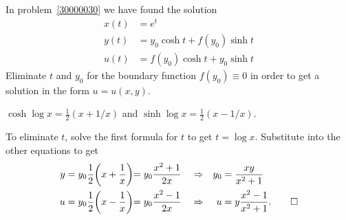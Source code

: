 In problem~\ref{30000030} we have found the solution
\begin{align*}
x(t) &= e^t           \\
y(t) &= y_0 \cosh t + f(y_0) \sinh t   \\
u(t) &= f(y_0) \cosh t + y_0 \sinh t
\end{align*}
Eliminate $t$ and $y_0$ for the boundary function $f(y_0)\equiv 0$ in order
to get a solution in the form $u = u(x,y)$.

\begin{hinweis}
$\cosh \log x = \frac12(x+1/x)$ and
$\sinh \log x = \frac12(x-1/x)$.
\end{hinweis}

\begin{loesung}
To eliminate $t$, solve the first formula for $t$ to get $t=\log x$.
Substitute into the other equations to get
\begin{align*}
y &= y_0 \frac12\biggl(x+\frac1x\biggl) = y_0\frac{x^2+1}{2x}
&&\Rightarrow &
y_0 &= \frac{xy}{x^2+1}\\
u &= y_0 \frac12\biggl(x-\frac1x\biggl) = y_0\frac{x^2-1}{2x}
&&\Rightarrow &
u &= y\frac{x^2-1}{x^2+1}.
\qedhere
\end{align*}
\end{loesung}




